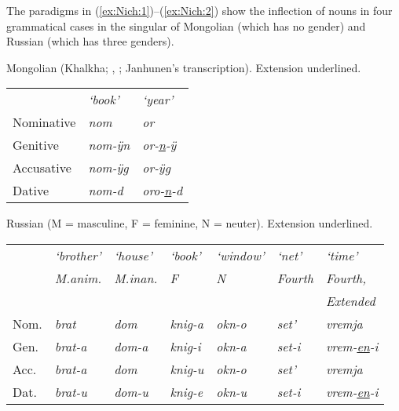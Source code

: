 \documentclass[output=collectionpaper]{langsci/langscibook}
\begin{document}
The paradigms in (\ref{ex:Nich:1})--(\ref{ex:Nich:2}) show the inflection of nouns in four grammatical cases in the singular of Mongolian (which has no gender) and Russian (which has three genders).

\ea
\label{ex:Nich:1}
Mongolian (Khalkha; \citealt[163]{Svantesson2003}, \citealt[297--298, 106--112, 66--68]{Janhunen2012}; Janhunen's transcription). Extension underlined.\\
\medskip
\begin{tabular}{l>{\itshape}l>{\itshape}l}
			 & \normalfont `book'	 & \normalfont `year'			\\
	Nominative &	nom	 &	or	\\
	Genitive	 &	nom-ÿn &	or-\underline{n}-ÿ	\\
	Accusative &		nom-ÿg &	or-ÿg		\\
	Dative	 &	nom-d	 &	oro-\underline{n}-d
\end{tabular}
\z

\ea
\label{ex:Nich:2}
Russian (M = masculine, F = feminine, N = neuter). Extension underlined.\\
\medskip
\begin{tabular}{l*{6}{>{\itshape}l}}
	 &	\normalfont `brother'	 &\normalfont `house' &\normalfont 	`book' &	\normalfont `window'	 &\normalfont `net'	 &\normalfont `time'\\
	 &\normalfont 	M.anim. &\normalfont 	M.inan.	 &\normalfont F	 &\normalfont N	 &\normalfont Fourth &\normalfont 	Fourth, \\
	 &&&&&&\normalfont Extended\\
	Nom.	 &brat &	dom	 &knig-a	 &okn-o &	set'	 &vremja	\\
	Gen.	 &brat-a	 &dom-a &	knig-i &	okn-a	 &set-i	 &vrem-\underline{en}-i\\
	Acc.	 &brat-a	 &dom &	knig-u	 &okn-o	 &set'	 &vremja\\
	Dat.	 &brat-u &	dom-u	 &knig-e &	okn-u &	set-i	 &vrem-\underline{en}-i
\end{tabular}
\z
\end{document}

